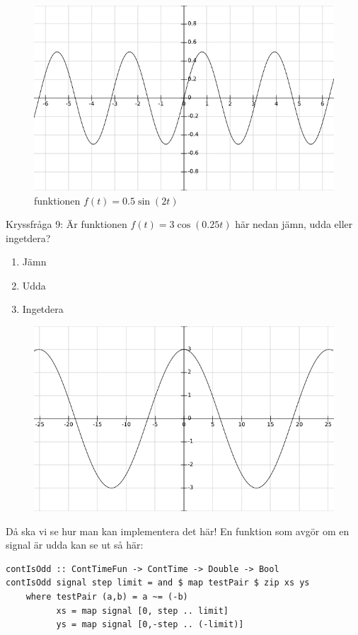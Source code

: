 \documentclass{article}
\begin{document}
\begin{figure}[ht]
\centerline{\includegraphics[scale=0.50]{image08.png}}
\caption{funktionen $f(t) = 0.5 \sin(2t)$}
\label{}
\end{figure}

\newpage

Kryssfråga 9: Är funktionen $f(t)=3\cos(0.25t)$ här nedan jämn, udda eller ingetdera?
\begin{enumerate}[label={\alph*)},font={\bfseries}]
    \item Jämn
    \item Udda
    \item Ingetdera
\end{enumerate}

\begin{figure}[ht]
\centerline{\includegraphics[scale=0.50]{image11.png}}
\caption{}
\label{}
\end{figure}

Då ska vi se hur man kan implementera det här! En funktion som avgör om en signal är udda kan se ut så här:
\begin{verbatim}
contIsOdd :: ContTimeFun -> ContTime -> Double -> Bool
contIsOdd signal step limit = and $ map testPair $ zip xs ys
    where testPair (a,b) = a ~= (-b)
          xs = map signal [0, step .. limit]
          ys = map signal [0,-step .. (-limit)]
\end{verbatim}
\end{document}
